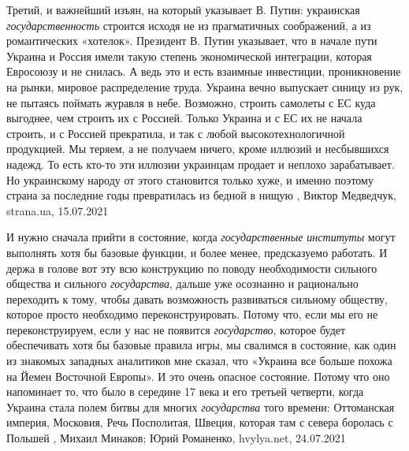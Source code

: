 Третий, и важнейший изъян, на который указывает В. Путин: украинская
\emph{государственность} строится исходя не из прагматичных соображений, а из
романтических «хотелок». Президент В. Путин указывает, что в начале пути
Украина и Россия имели такую степень экономической интеграции, которая
Евросоюзу и не снилась. А ведь это и есть взаимные инвестиции, проникновение на
рынки, мировое распределение труда. Украина вечно выпускает синицу из рук, не
пытаясь поймать журавля в небе. Возможно, строить самолеты с ЕС куда выгоднее,
чем строить их с Россией. Только Украина и с ЕС их не начала строить, и с
Россией прекратила, и так с любой высокотехнологичной продукцией. Мы теряем, а
не получаем ничего, кроме иллюзий и несбывшихся надежд. То есть кто-то эти
иллюзии украинцам продает и неплохо зарабатывает. Но украинскому народу от
этого становится только хуже, и именно поэтому страна за последние годы
превратилась из бедной в нищую
, 
Виктор Медведчук, strana.ua, 15.07.2021

И нужно сначала прийти в состояние, когда \emph{государственные институты} могут
выполнять хотя бы базовые функции, и более менее, предсказуемо работать. И
держа в голове вот эту всю конструкцию по поводу необходимости сильного
общества и сильного \emph{государства}, дальше уже осознанно и рационально переходить
к тому, чтобы давать возможность развиваться сильному обществу, которое просто
необходимо переконструировать.
Потому что, если мы его не переконструируем, если у нас не появится
\emph{государство}, которое будет обеспечивать хотя бы базовые правила игры, мы
свалимся в состояние, как один из знакомых западных аналитиков мне сказал, что
«Украина все больше похожа на Йемен Восточной Европы».
И это очень опасное состояние. Потому что оно напоминает то, что было в
середине 17 века и его третьей четверти, когда Украина стала полем битвы для
многих \emph{государства} того времени: Оттоманская империя, Московия, Речь
Посполитая, Швеция, которая там с севера боролась с Польшей
, 
Михаил Минаков; Юрий Романенко, hvylya.net, 24.07.2021

